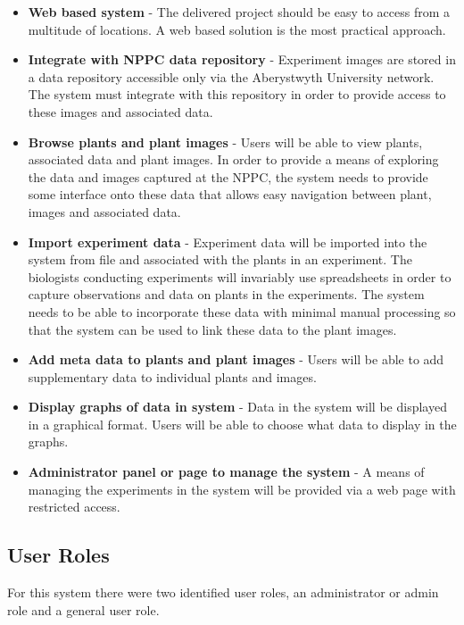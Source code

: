 \begin{itemize}
\item \textbf{Web based system} - The delivered project should be easy to access from a multitude of locations. A web based solution is the most practical approach.
\item \textbf{Integrate with NPPC data repository} - Experiment images are stored in a data repository accessible only via the Aberystwyth University network. The system must integrate with this repository in order to provide access to these images and associated data.
\item \textbf{Browse plants and plant images} - Users will be able to view plants, associated data and plant images. In order to provide a means of exploring the data and images captured at the NPPC, the system needs to provide some interface onto these data that allows easy navigation between plant, images and associated data.
\item \textbf{Import experiment data} - Experiment data will be imported into the system from file and associated with the plants in an experiment. The biologists conducting experiments will invariably use spreadsheets in order to capture observations and data on plants in the experiments. The system needs to be able to incorporate these data with minimal manual processing so that the system can be used to link these data to the plant images. 
\item \textbf{Add meta data to plants and plant images} - Users will be able to add supplementary data to individual plants and images. 
\item \textbf{Display graphs of data in system} - Data in the system will be displayed in a graphical format. Users will be able to choose what data to display in the graphs.
\item \textbf{Administrator panel or page to manage the system} - A means of managing the experiments in the system will be provided via a web page with restricted access.
\end{itemize}







\subsection{User Roles}
For this system there were two identified user roles, an administrator or admin role and a general user role.

